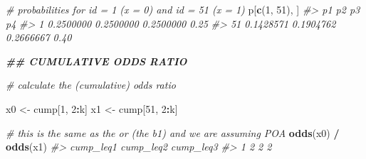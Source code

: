 \documentclass[
  man, mask,floatsintext]{apa6}
\newenvironment{Shaded}{\begin{snugshade}}{\end{snugshade}}
\newcommand{\CommentTok}[1]{\textcolor[rgb]{0.56,0.35,0.01}{\textit{#1}}}
\newcommand{\DecValTok}[1]{\textcolor[rgb]{0.00,0.00,0.81}{#1}}
\newcommand{\DocumentationTok}[1]{\textcolor[rgb]{0.56,0.35,0.01}{\textbf{\textit{#1}}}}
\newcommand{\FunctionTok}[1]{\textcolor[rgb]{0.13,0.29,0.53}{\textbf{#1}}}
\newcommand{\NormalTok}[1]{#1}
\newcommand{\OtherTok}[1]{\textcolor[rgb]{0.56,0.35,0.01}{#1}}
\newcommand{\SpecialCharTok}[1]{\textcolor[rgb]{0.81,0.36,0.00}{\textbf{#1}}}
\begin{document}
\begin{Shaded}
\begin{Highlighting}[]
\CommentTok{\# probabilities for id = 1 (x = 0) and id = 51 (x = 1)}
\NormalTok{p[}\FunctionTok{c}\NormalTok{(}\DecValTok{1}\NormalTok{, }\DecValTok{51}\NormalTok{), ]}
\CommentTok{\#\textgreater{}           p1        p2        p3   p4}
\CommentTok{\#\textgreater{} 1  0.2500000 0.2500000 0.2500000 0.25}
\CommentTok{\#\textgreater{} 51 0.1428571 0.1904762 0.2666667 0.40}

\DocumentationTok{\#\# CUMULATIVE ODDS RATIO}

\CommentTok{\# calculate the (cumulative) odds ratio}

\NormalTok{x0 }\OtherTok{\textless{}{-}}\NormalTok{ cump[}\DecValTok{1}\NormalTok{, }\DecValTok{2}\SpecialCharTok{:}\NormalTok{k]}
\NormalTok{x1 }\OtherTok{\textless{}{-}}\NormalTok{ cump[}\DecValTok{51}\NormalTok{, }\DecValTok{2}\SpecialCharTok{:}\NormalTok{k]}

\CommentTok{\# this is the same as the or (the b1) and we are assuming POA}
\FunctionTok{odds}\NormalTok{(x0) }\SpecialCharTok{/} \FunctionTok{odds}\NormalTok{(x1)}
\CommentTok{\#\textgreater{}   cump\_leq1 cump\_leq2 cump\_leq3}
\CommentTok{\#\textgreater{} 1         2         2         2}
\end{Highlighting}
\end{Shaded}

\normalsize

\scriptsize
\end{document}
